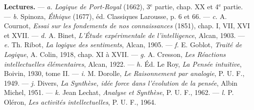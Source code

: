 {\bf Lectures.} — {\it a.} {\it Logique de Port-Royal} (1662), 3$^\text{e}$ partie, chap. XX et
4$^\text{e}$ partie. — {\it b.} Spinoza, {\it Éthique} (1677), éd. Classiques Larousse, p. 6 et 66.
— {\it c.} A. Cournot, {\it Essai sur les fondements de nos connaissances} (1851),
chap. I, VII, XVI et XVII. — {\it d.} A. Binet, {\it L'Étude expérimentale de l’intelligence},
Alcan, 1903. — {\it e.} Th. Ribot, {\it La logique des sentiments}, Alcan, 1905.
— {\it f.} E. Goblot, {\it Traité de Logique}, A. Colin, 1918, chap. XI à XVII. —
{\it g.} A. Cresson, {\it Les Réactions intellectuelles élémentaires}, Alcan, 1922. —
{\it h.} Éd. Le Roy, {\it La Pensée intuitive}, Boivin, 1930, tome II. — {\it i.} M. Dorolle,
{\it Le Raisonnement par analogie}, P. U. F., 1949. — {\it j.} Divers, {\it La Synthèse,
idée force dans l'évolution de la pensée}, Albin Michel, 1951. — {\it k.} Jean Lechat,
{\it Analyse et Synthèse}, P. U. F., 1962. — {\it l.} P. Oléron, {\it Les activités intellectuelles},
P. U. F., 1964.

